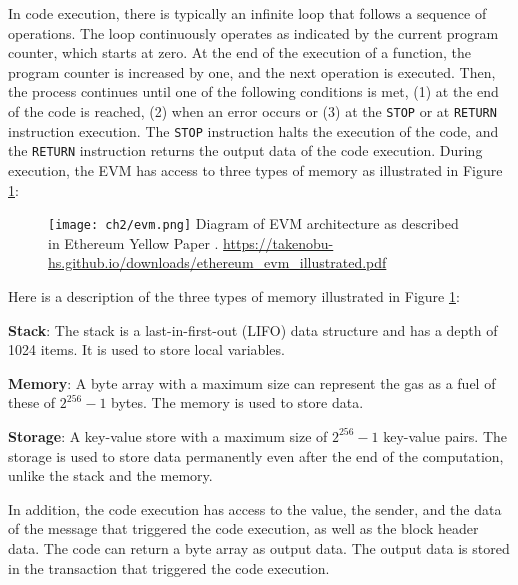 In code execution, there is typically an infinite loop that follows a sequence of operations. The loop continuously operates as indicated
by the current program counter, which starts at zero. At the end of the execution of a function, the program counter is increased by one, and the next
operation is executed. Then, the process continues until one of the following conditions is met, (1) at the end of the code is reached, (2) when an error occurs or
(3) at the \texttt{STOP} or at \texttt{RETURN} instruction execution. The \texttt{STOP} instruction halts the execution of the code, and the \texttt{RETURN} instruction
returns the output data of the code execution. During execution, the EVM has access to three types of memory as illustrated in Figure \ref{fig:evm}:

\begin{figure}[H]
    \centering
    \texttt{[image: ch2/evm.png]}
    {Diagram of EVM architecture as described in Ethereum Yellow Paper \cite{ethereum_yellow_paper}.
    }{\url{https://takenobu-hs.github.io/downloads/ethereum_evm_illustrated.pdf}}
    \label{fig:evm}
 \end{figure}

 Here is a description of the three types of memory illustrated in Figure \ref{fig:evm}:

\begin{list}{-}{}
   \item \textbf{Stack}: The stack is a last-in-first-out (LIFO) data structure and has a depth of 1024 items. It is used to store local variables.
   \item \textbf{Memory}: A byte array with a maximum size can represent the gas as a fuel of these of $2^{256} - 1$ bytes. The memory is used to store data.
   \item \textbf{Storage}: A key-value store with a maximum size of $2^{256} - 1$ key-value pairs. The storage is used to store data permanently even after the end
         of the computation, unlike the stack and the memory.
\end{list}


In addition, the code execution has access to the value, the sender, and the data of the message that triggered the code execution, as well as
the block header data. The code can return a byte array as output data. The output data is stored in the transaction that triggered the code execution.




